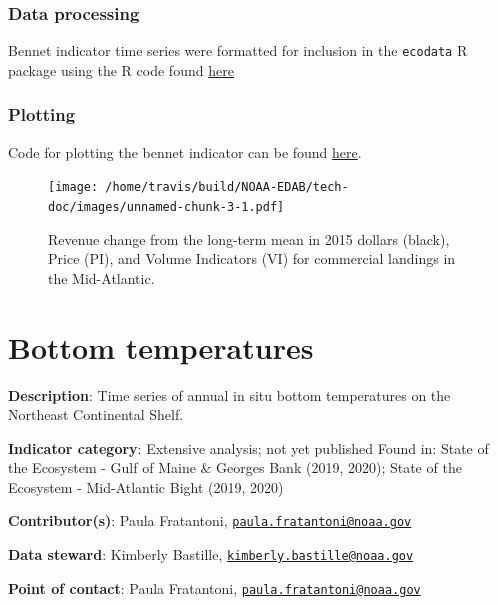 \documentclass[
]{book}
\begin{document}
\hypertarget{data-processing-1}{%
\subsection{Data processing}\label{data-processing-1}}

Bennet indicator time series were formatted for inclusion in the \texttt{ecodata} R package using the R code found \href{https://raw.githubusercontent.com/NOAA-EDAB/ecodata/master/data-raw/get_bennet.R}{here}

\hypertarget{plotting-1}{%
\subsection{Plotting}\label{plotting-1}}

Code for plotting the bennet indicator can be found \href{https://github.com/NOAA-EDAB/ecodata/blob/master/chunk-scripts/human_dimensions.Rmd-bennet.R}{here}.

\begin{figure}
\centering
\texttt{[image: /home/travis/build/NOAA-EDAB/tech-doc/images/unnamed-chunk-3-1.pdf]}
\caption{\label{fig:unnamed-chunk-3}Revenue change from the long-term mean in 2015 dollars (black), Price (PI), and Volume Indicators (VI) for commercial landings in the Mid-Atlantic.}
\end{figure}

\hypertarget{bottom-temperatures}{%
\chapter{Bottom temperatures}\label{bottom-temperatures}}

\textbf{Description}: Time series of annual in situ bottom temperatures on the Northeast Continental Shelf.

\textbf{Indicator category}: Extensive analysis; not yet published
Found in: State of the Ecosystem - Gulf of Maine \& Georges Bank (2019, 2020); State of the Ecosystem - Mid-Atlantic Bight (2019, 2020)

\textbf{Contributor(s)}: Paula Fratantoni, \href{mailto:paula.fratantoni@noaa.gov}{\nolinkurl{paula.fratantoni@noaa.gov}}

\textbf{Data steward}: Kimberly Bastille, \href{mailto:kimberly.bastille@noaa.gov}{\nolinkurl{kimberly.bastille@noaa.gov}}

\textbf{Point of contact}: Paula Fratantoni, \href{mailto:paula.fratantoni@noaa.gov}{\nolinkurl{paula.fratantoni@noaa.gov}}
\end{document}
